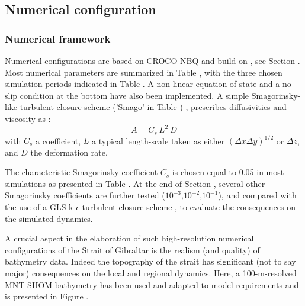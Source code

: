 \subsection{Numerical configuration}
\label{section3Dnum}

\subsubsection{Numerical framework}

Numerical configurations are based on CROCO-NBQ and build on \citet{hilt_2020}, see Section . Most numerical parameters are summarized in Table \color{red}, with the three chosen simulation periods indicated in Table \color{black}. A non-linear equation of state and a no-slip condition at the bottom have also been implemented. A simple Smagorinsky-like turbulent closure scheme ('Smago' in Table ) \citep{smagorinsky_1963}, prescribes diffusivities and viscosity as :
\begin{equation}
    A = C_s \ L^2 \ D
\end{equation}
with $C_s$ a coefficient, $L$ a typical length-scale taken as either $(\Delta x \Delta y)^{1/2}$ or $\Delta z$, and $D$ the deformation rate.

The characteristic Smagorinsky coefficient $C_s$ is chosen equal to 0.05 in most simulations as presented in Table . At the end of Section , several other Smagorinsky coefficients are further tested  ($10^{-3}$,$10^{-2}$,$10^{-1}$), and compared with the use of a GLS k-$\epsilon$ turbulent closure scheme \citep{umlauf_2003}, to evaluate the consequences on the simulated dynamics.

A crucial aspect in the elaboration of such high-resolution numerical configurations of the Strait of Gibraltar is the realism (and quality) of bathymetry data. Indeed the topography of the strait has significant (not to say major) consequences on the local and regional dynamics. Here, a 100-m-resolved MNT SHOM bathymetry has been used and adapted to model requirements and is presented in Figure .

